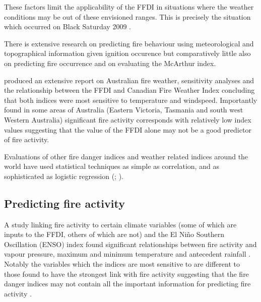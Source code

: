 \documentclass{article}
\begin{document}
These factors limit the applicability of the FFDI in situations where the weather conditions may be out of these envisioned ranges. This is precisely the situation which occurred on Black Saturday 2009 \citep{harris12}. 

There is extensive research on predicting fire behaviour using meteorological and topographical information given ignition occurence but comparatively little also on  predicting fire occurrence and on evaluating the McArthur index. 

\citet{dowdy10} produced an extensive report on Australian fire weather, sensitivity analyses and the relationship between the FFDI and Canadian Fire Weather Index concluding that both indices were most sensitive to temperature and windspeed. Importantly \citet{dowdy10} found in some areas of Australia (Eastern Victoria, Tasmania and south west Western Australia) significant fire activity corresponds with relatively low index values suggesting that the value of the FFDI alone may not be a good predictor of fire activity. 

Evaluations of other fire danger indices and weather related indices around the world have used statistical techniques as simple as correlation, and as sophisticated as logistic regression (\cite{andrews03}; \cite{harris14}). 


\subsection{Predicting fire activity}
A study linking fire activity to certain climate variables (some of which are inputs to the FFDI, others of which are not) and the El Niño Southern Oscillation (ENSO) index found significant relationships between fire activity and vapour pressure, maximum and minimum temperature and antecedent rainfall \citep{harris14}. Notably the variables which the indices are most sensitive to are different to those found to have the strongest link with fire activity suggesting that the fire danger indices may not contain all the important information for predicting fire activity \citep{harris14}. 
\end{document}
